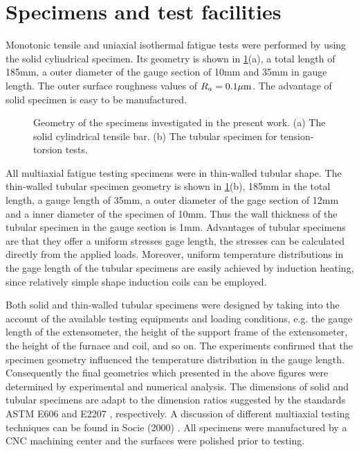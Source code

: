 \section{Specimens and test facilities}
\label{Sec:Specimens}
\noindent Monotonic tensile and uniaxial isothermal fatigue tests were performed by using the solid cylindrical specimen.
Its geometry is shown in \ref{Fig:Specimen}(a), a total length of 185mm, a outer diameter of the gauge section of 10mm and 35mm in gauge length.
The outer surface roughness values of $R_a=0.1\rm{\mu m}$.
The advantage of solid specimen is easy to be manufactured.

\begin{figure}[!htp]
\caption{Geometry of the specimens investigated in the present work. (a) The solid cylindrical tensile bar. (b) The tubular specimen for tension-torsion tests.}
\label{Fig:Specimen}
\end{figure}
All multiaxial fatigue testing specimens were in thin-walled tubular shape.
The thin-walled tubular specimen geometry is shown in \ref{Fig:Specimen}(b), 185mm in the total length, a gauge length of 35mm, a outer diameter of the gage section of 12mm and a inner diameter of the specimen of 10mm.
Thus the wall thickness of the tubular specimen in the gauge section is 1mm.
Advantages of tubular specimens are that they offer a uniform stresses gage length, the stresses can be calculated directly from the applied loads.
Moreover, uniform temperature distributions in the gage length of the tubular specimens are easily achieved by induction heating, since relatively simple shape induction coils can be employed.

Both solid and thin-walled tubular specimens were designed by taking into the account of the available testing equipments and loading conditions, e.g. the gauge length of the extensometer, the height of the support frame of the extensometer, the height of the furnace and coil, and so on.
The experiments confirmed that the specimen geometry influenced the temperature distribution in the gauge length.
Consequently the final geometries which presented in the above figures were determined by experimental and numerical analysis.
The dimensions of solid and tubular specimens are adapt to the dimension ratios suggested by the standards ASTM E606 \cite{astm1998standard} and E2207 \cite{standard2007e2207}, respectively.
A discussion of different multiaxial testing techniques can be found in Socie (2000) \cite{socie2000multiaxial}.
All specimens were manufactured by a CNC machining center and the surfaces were polished prior to testing.


